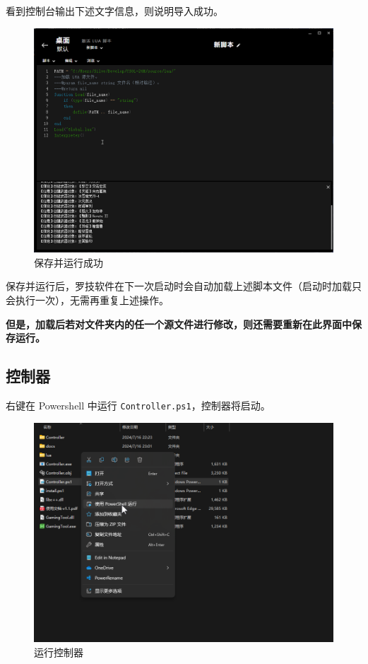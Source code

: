 看到控制台输出下述文字信息，则说明导入成功。

\begin{figure}[H]
    \Centering
    \includegraphics[width=\textwidth]{docs/assets/success.png}
    \caption{保存并运行成功}
\end{figure}

保存并运行后，罗技软件在下一次启动时会自动加载上述脚本文件（启动时加载只会执行一次），无需再重复上述操作。

\textbf{\color{red}但是，加载后若对文件夹内的任一个源文件进行修改，则还需要重新在此界面中保存运行。}

\subsection{控制器}

右键在 Powershell 中运行 \lstinline{Controller.ps1}，控制器将启动。

\begin{figure}[H]
    \Centering
    \includegraphics[width=\textwidth]{docs/assets/run_controller.png}
    \caption{运行控制器}
\end{figure}

